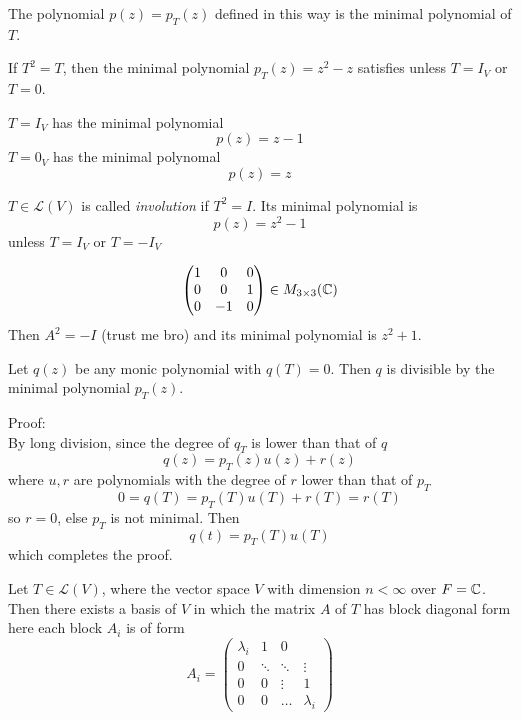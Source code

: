 \documentclass[12pt]{article}
\begin{document}
\begin{defn}
	The polynomial $p(z)=p_T(z)$ defined in this way is the minimal polynomial of $T$.
\end{defn}

\begin{ex}
	If $T^2=T$, then the minimal polynomial $p_T(z) = z^2 - z$ satisfies unless $T=I_V$ or $T=0$.
\end{ex}

\begin{ex}
	$T=I_V$ has the minimal polynomial
	$$p(z) = z-1$$
	$T=0_V$ has the minimal polynomal
	$$p(z) = z$$
\end{ex}

\begin{ex}
	$T\in\mathcal L(V)$ is called \emph{involution} if $T^2=I$. Its minimal polynomial is
	$$p(z)=z^2-1$$
	unless $T=I_V$ or $T=-I_V$
\end{ex}

\begin{ex}
	$$\begin{pmatrix}1 & 0 & 0 \\ 0 & 0 & 1 \\ 0 & -1 & 0\end{pmatrix}\in M_{3\times 3}(\mathbb{C})$$
	Then $A^2 = -I$ (trust me bro) and its minimal polynomial is $z^2+1$.
\end{ex}

\begin{thm}
	Let $q(z)$ be any monic polynomial with $q(T)=0$. Then $q$ is divisible by the minimal polynomial $p_T(z)$.
\end{thm}

Proof: \\
By long division, since the degree of $q_T$ is lower than that of $q$
$$q(z) = p_T(z)u(z) + r(z)$$
where $u,r$ are polynomials with the degree of $r$ lower than that of $p_T$
$$0=q(T) = p_T(T)u(T)+r(T) = r(T)$$
so $r=0$, else $p_T$ is not minimal. Then
$$q(t) = p_T(T)u(T)$$
which completes the proof.

\begin{thm}Let $T\in\mathcal L(V)$, where the vector space $V$ with dimension $n<\infty$ over $F=\mathbb{C}$. Then there exists a basis of $V$ in which the matrix $A$ of $T$ has block diagonal form here each block $A_i$ is of form
	$$A_i = \begin{pmatrix} \lambda_i & 1 & 0 \\ 0 & \ddots & \ddots & \vdots \\ 0 & 0 & \vdots & 1 \\ 0 & 0 & \dots & \lambda_i\end{pmatrix}$$
\end{thm}
\end{document}
